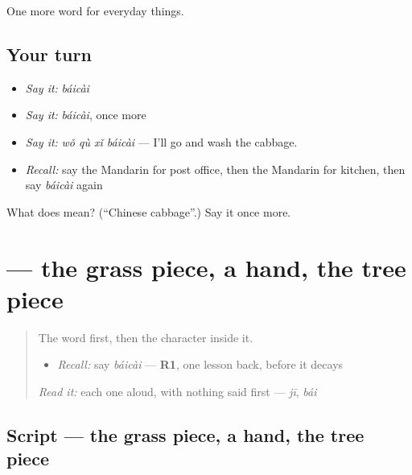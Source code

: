 \begin{grammarlens}[title={What you've built}]
One more word for everyday things.
\end{grammarlens}

\subsection*{Your turn}
\begin{itemize}
\raggedright
  \item \emph{Say it:} \emph{báicài}
  \item \emph{Say it:} \emph{báicài}, once more
  \item \emph{Say it:} \emph{wǒ qù xǐ báicài} — I'll go and wash the cabbage.
  \item \emph{Recall:} say the Mandarin for post office, then the Mandarin for kitchen, then say \emph{báicài} again
\end{itemize}

\begin{tcolorbox}[breakable,colback=teal!4,colframe=teal!35!black,title={Before you move on}]
What does  mean? (\textquotedblleft{}Chinese cabbage\textquotedblright{}.) Say it once more.
\end{tcolorbox}
\section[\texorpdfstring{\zh{菜} (cài)}{菜 (cài)}]{ — the grass piece, a hand, the tree piece}

\label{lesson:ZH-W101-cai}



\begin{quote}
The word first, then the character inside it.

\begin{itemize}
\raggedright
  \item \emph{Recall:} say \emph{báicài} — \textbf{R1}, one lesson back, before it decays
\end{itemize}

\begin{quote}
 
\end{quote}

\emph{Read it:} each one aloud, with nothing said first — \emph{jī}, \emph{bái}
\end{quote}

\subsection*{Script — the grass piece, a hand, the tree piece}

